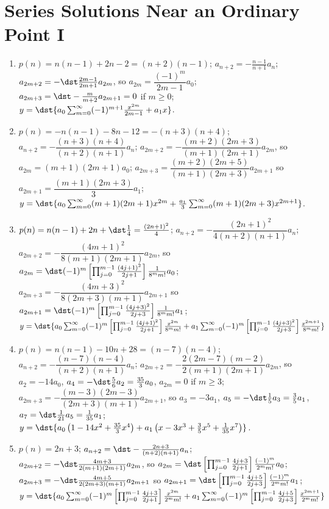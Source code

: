 \documentclass[openany]{book}
\newenvironment{sectionSolutions}{
 \begin{enumerate}[item-label={\thesection.\arabic{enumi}.}]
}{
 \end{enumerate}
}
\begin{document}
\section{Series Solutions Near an Ordinary Point I}

\begin{sectionSolutions}
\item
$p(n)=n(n-1)+2n-2=(n+2)(n-1)$;
$a_{n+2}=-\frac{n-1}{ n+1}a_n$;
$a_{2m+2}=-\dst\frac{2m-1}{2m+1}a_{2m}$, so
$a_{2m}=\dfrac{(-1)^m}{2m-1}a_0$;
$a_{2m+3}=\dst-\frac{m}{ m+2}a_{2m+1}=0$
if  $m\ge0$;
$y=\dst{a_0\sum_{m=0}^\infty(-1)^{m+1}\frac{x^{2m}}{2m-1}+a_1x}$.

\item
$p(n)=-n(n-1)-8n-12=-(n+3)(n+4)$;
$a_{n+2}=-\dfrac{(n+3)(n+4)}{(n+2)(n+1)}a_n$;
$a_{2m+2}=-\dfrac{(m+2)(2m+3)}{(m+1)(2m+1)}a_{2m}$, so
$a_{2m}=(m+1)(2m+1)a_0$;
$a_{2m+3}=\dfrac{(m+2)(2m+5)}{(m+1)(2m+3)}a_{2m+1}$
 so $a_{2m+1}=\dfrac{(m+1)(2m+3)}{3}a_1$;
$y=\dst{a_0\sum_{m=0}^\infty(m+1)(2m+1)x^{2m}+\frac{a_1}{3}\sum_{m=0}^\infty
(m+1)(2m+3)x^{2m+1}}$.


\item
$p(n)=n(n-1)+2n+\dst\frac{1}{4}=\frac{(2n+1)^2}{4}$;
$a_{n+2}=-\dfrac{(2n+1)^2}{4(n+2)(n+1)}a_n$;
$a_{2m+2}=-\dfrac{(4m+1)^2}{8(m+1)(2m+1)}a_{2m}$, so
$a_{2m}=\dst
(-1)^m\left[\prod_{j=0}^{m-1}\frac{(4j+1)^2}{2j+1}\right]\frac{1}{8^mm!}a_0$;
$a_{2m+3}=-\dfrac{(4m+3)^2}{8(2m+3)(m+1)}a_{2m+1}$
 so $a_{2m+1}=\dst
(-1)^m\left[\prod_{j=0}^{m-1}\frac{(4j+3)^2}{2j+3}\right]
\frac{1}{8^mm!}a_1$;
$y=\dst{a_0\sum_{m=0}^\infty
(-1)^m\left[\prod_{j=0}^{m-1}\frac{(4j+1)^2}{2j+1}\right]\frac{x^{2m}}{8^mm!}
+a_1\sum_{m=0}^\infty
(-1)^m\left[\prod_{j=0}^{m-1}\frac{(4j+3)^2}{2j+3}\right]
\frac{x^{2m+1}}{8^mm!}}$




\item
$p(n)=n(n-1)-10n+28=(n-7)(n-4)$;
$a_{n+2}=-\dfrac{(n-7)(n-4)}{(n+2)
(n+1)}a_n$;
$a_{2m+2}=-\dfrac{2(2m-7)(m-2)}{2(m+1)(2m+1)}a_{2m}$, so
$a_2=-14a_0$, $a_4=-\dst\frac{5}{6}a_2=\frac{35}{3}a_0$,
$a_{2m}=0$ if $m\ge3$;
$a_{2m+3}=-\dfrac{(m-3)(2m-3)}{(2m+3)(m+1)}a_{2m+1}$,
so $a_3=-3a_1$, $a_5=-\dst\frac{1}{5}a_3=\frac{3}{5}a_1$,
$a_7=\dst\frac{1}{21}a_5=\frac{1}{35}a_1$;\\
$y=\dst{a_0\left(1-14x^2+\frac{35}{3}x^4\right)+a_1\left(x-3x^3+\frac{3}{5}x^5
+\frac{1}{35}x^7\right)}$.



\item
$p(n)=2n+3$;
$a_{n+2}=\dst-\frac{2n+3}{(n+2)(n+1)}a_n$;
$a_{2m+2}=-\dst\frac{4m+3}{2(m+1)(2m+1)}a_{2m}$, so
$a_{2m}=\dst\left[\prod_{j=0}^{m-1}\frac{4j+3}{2j+1}\right]
\frac{(-1)^m}{2^mm!}a_0$;
$a_{2m+3}=-\dst\frac{4m+5}{2(2m+3)(m+1)}a_{2m+1}$
 so $a_{2m+1}=\dst
\left[\prod_{j=0}^{m-1}\frac{4j+5}{2j+3}\right]\frac{(-1)^m}{
2^mm!}a_1$;
$y=\dst{a_0\sum_{m=0}^\infty
(-1)^m\left[\prod_{j=0}^{m-1}\frac{4j+3}{2j+1}\right]\frac{x^{2m}}{2^mm!}
+a_1\sum_{m=0}^\infty
(-1)^m\left[\prod_{j=0}^{m-1}\frac{4j+5}{2j+3}\right]\frac{x^{2m+1}}{
2^mm!}}$



\end{sectionSolutions}
\end{document}

